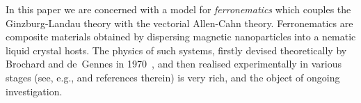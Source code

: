 \documentclass[a4paper, 11pt, twoside, leqno]{article}
\theoremstyle{definition}              %
\theoremstyle{remark}                  %
\renewcommand{\H}{\mathscr{H}}
\begin{document}
%
 

%

\vskip5pt

In this paper we are concerned with a model for \emph{ferronematics} which couples 
the Ginzburg-Landau theory with the vectorial Allen-Cahn theory. %
Ferronematics are composite materials obtained by dispersing magnetic nanoparticles into a nematic 
liquid crystal hosts. The physics of such systems, firstly devised theoretically 
by Brochard and de~Gennes in 1970~\cite{BrochardDeGennes}, and then realised experimentally 
in various stages (see, e.g., \cite{Mertelj} and references therein) is very rich, 
and the object of ongoing investigation. 
\end{document}
